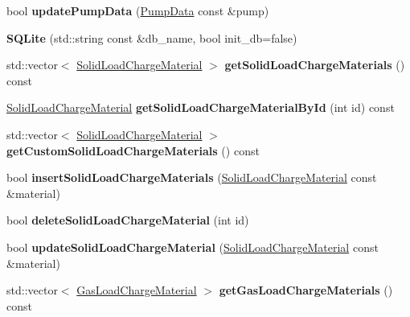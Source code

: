 \begin{DoxyCompactItemize}
\mbox{\label{class_s_q_lite_a5b7471c6eff2fd62ab2d465dd85e0768}} 
bool {\bfseries update\+Pump\+Data} (\hyperlink{class_pump_data}{Pump\+Data} const \&pump)
\item 
\mbox{\label{class_s_q_lite_a758f334ed7e72820f4f0e83d2b707625}} 
{\bfseries S\+Q\+Lite} (std\+::string const \&db\+\_\+name, bool init\+\_\+db=false)
\item 
\mbox{\label{class_s_q_lite_af6195f55e9658c24a8f14b884e490acb}} 
std\+::vector$<$ \hyperlink{class_solid_load_charge_material}{Solid\+Load\+Charge\+Material} $>$ {\bfseries get\+Solid\+Load\+Charge\+Materials} () const
\item 
\mbox{\label{class_s_q_lite_ab2a00b913321a96a4d7b700627195616}} 
\hyperlink{class_solid_load_charge_material}{Solid\+Load\+Charge\+Material} {\bfseries get\+Solid\+Load\+Charge\+Material\+By\+Id} (int id) const
\item 
\mbox{\label{class_s_q_lite_a868c571d80d43a991762ec20c168ebb2}} 
std\+::vector$<$ \hyperlink{class_solid_load_charge_material}{Solid\+Load\+Charge\+Material} $>$ {\bfseries get\+Custom\+Solid\+Load\+Charge\+Materials} () const
\item 
\mbox{\label{class_s_q_lite_a5c40ac3b9a6abb85c9cfbe50802672c5}} 
bool {\bfseries insert\+Solid\+Load\+Charge\+Materials} (\hyperlink{class_solid_load_charge_material}{Solid\+Load\+Charge\+Material} const \&material)
\item 
\mbox{\label{class_s_q_lite_a0a240c89a1e0c96ef61c3beae68b1467}} 
bool {\bfseries delete\+Solid\+Load\+Charge\+Material} (int id)
\item 
\mbox{\label{class_s_q_lite_ac2c7142caa0154783f7ed73afa4bd6db}} 
bool {\bfseries update\+Solid\+Load\+Charge\+Material} (\hyperlink{class_solid_load_charge_material}{Solid\+Load\+Charge\+Material} const \&material)
\item 
\mbox{\label{class_s_q_lite_accd7e97b19298b75eabc3a2b4bbc9b1c}} 
std\+::vector$<$ \hyperlink{class_gas_load_charge_material}{Gas\+Load\+Charge\+Material} $>$ {\bfseries get\+Gas\+Load\+Charge\+Materials} () const

\end{DoxyCompactItemize}
